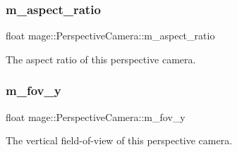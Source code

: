 \subsubsection{\texorpdfstring{m\+\_\+aspect\+\_\+ratio}{m\_aspect\_ratio}}
{\footnotesize\ttfamily float mage\+::\+Perspective\+Camera\+::m\+\_\+aspect\+\_\+ratio\hspace{0.3cm}{\ttfamily [private]}}

The aspect ratio of this perspective camera. \hypertarget{classmage_1_1_perspective_camera_abdcf1a0cdd247e0f7e14e70898678af6}{}\label{classmage_1_1_perspective_camera_abdcf1a0cdd247e0f7e14e70898678af6} 
\subsubsection{\texorpdfstring{m\+\_\+fov\+\_\+y}{m\_fov\_y}}
{\footnotesize\ttfamily float mage\+::\+Perspective\+Camera\+::m\+\_\+fov\+\_\+y\hspace{0.3cm}{\ttfamily [private]}}

The vertical field-\/of-\/view of this perspective camera. 